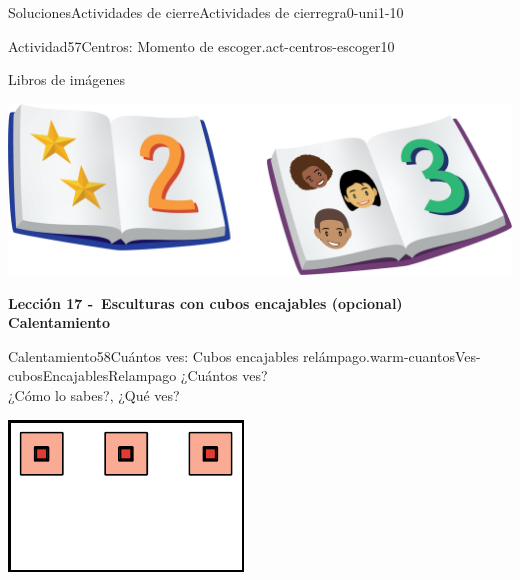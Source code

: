 \documentclass[twoside,10pt,]{article}
\begin{document}
\begin{solutions-section}{Soluciones}{Actividades de cierre}{}{Actividades de cierre}{}{}{gra0-uni1-10}
\begin{activitysolution}{Actividad}{57}{Centros: Momento de escoger.}{act-centros-escoger10}
\begin{sidebyside}{2}{0.025}{0.025}{0.05}
\begin{sbspanel}{0.45}
\end{sbspanel}%
\begin{sbspanel}{0.45}%
Libros de imágenes%
\par
\includegraphics[width=\linewidth]{external/png-source/K.1.D Beta Student Workbooks.Books.png}
\end{sbspanel}%
\end{sidebyside}%
\end{activitysolution}%
\par\medskip
\noindent\textbf{\large{}\space\textperiodcentered\space{}Lección 17 -~Esculturas con cubos encajables (opcional)\\
\space\textperiodcentered\space{}Calentamiento}
\begin{explorationsolution}{Calentamiento}{58}{Cuántos ves: Cubos encajables relámpago.}{warm-cuantosVes-cubosEncajablesRelampago}%
¿Cuántos ves?\\
 ¿Cómo lo sabes?, ¿Qué ves?%
\begin{sidebyside}{3}{0.0166666666666667}{0.0166666666666667}{0.0333333333333333}%
\begin{sbspanel}{0.3}%
\includegraphics[width=\linewidth]{external/svg-source/tikz-file-153034.pdf}
\end{sbspanel}%
\begin{sbspanel}{0.3}%

\end{sbspanel}
\end{sidebyside}
\end{explorationsolution}
\end{solutions-section}
\end{document}
